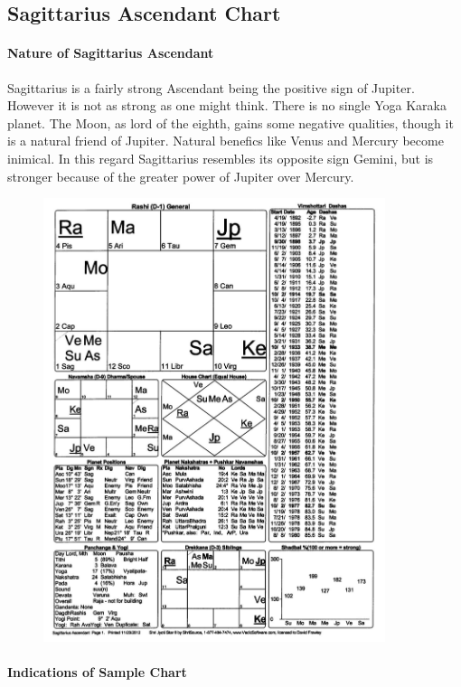  

\subsection{Sagittarius Ascendant Chart}
 

\paragraph{Nature of Sagittarius Ascendant}

 

Sagittarius is a fairly strong Ascendant being the positive sign of Jupiter. However it is not as strong as one might think. There is no single Yoga Karaka planet. The Moon, as lord of the eighth, gains some negative qualities, though it is a natural friend of Jupiter. Natural benefics like Venus and Mercury become inimical. In this regard Sagittarius resembles its opposite sign Gemini, but is stronger because of the greater power of Jupiter over Mercury.

 

\begin{figure}[h]
\centering
\includegraphics[width=10cm]{pics/Sagittarius-Ascendant.jpg}
\caption{}
\end{figure}
 

 

\paragraph{Indications of Sample Chart}

